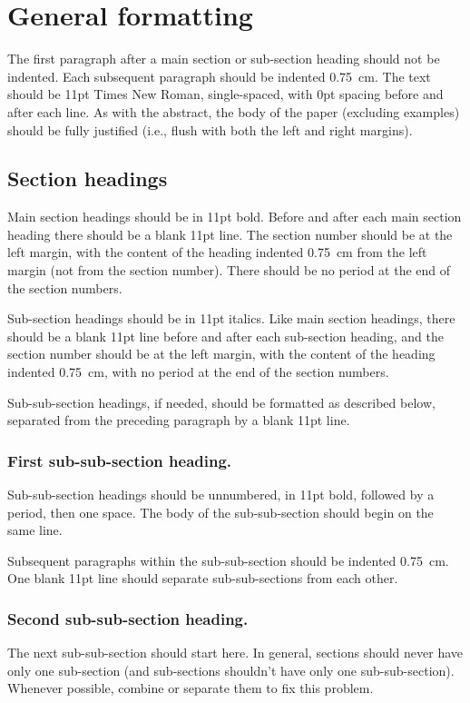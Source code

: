 \documentclass[xelatex,linguex]{TWPL}
\author{Jane Smith (in 11pt italics)}
\affiliation{University of Wherever (in 11pt italics)}
\begin{document}
\section{General formatting}

The first paragraph after a main section or sub-section heading should not be indented. Each subsequent paragraph should be indented 0.75~cm. The text should be 11pt Times New Roman, single-spaced, with 0pt spacing before and after each line. As with the abstract, the body of the paper (excluding examples) should be fully justified (i.e., flush with both the left and right margins).

\subsection{Section headings}

Main section headings should be in 11pt bold. Before and after each main section heading there should be a blank 11pt line. The section number should be at the left margin, with the content of the heading indented 0.75~cm from the left margin (not from the section number). There should be no period at the end of the section numbers.

Sub-section headings should be in 11pt italics. Like main section headings, there should be a blank 11pt line before and after each sub-section heading, and the section number should be at the left margin, with the content of the heading indented 0.75~cm, with no period at the end of the section numbers.

Sub-sub-section headings, if needed, should be formatted as described below, separated from the preceding paragraph by a blank 11pt line.

\subsubsection{First sub-sub-section heading.} Sub-sub-section headings should be unnumbered, in 11pt bold, followed by a period, then one space. The body of the sub-sub-section should begin on the same line.

Subsequent paragraphs within the sub-sub-section should be indented 0.75~cm. One blank 11pt line should separate sub-sub-sections from each other. 

\subsubsection{Second sub-sub-section heading.} The next sub-sub-section should start here. In general, sections should never have only one sub-section (and sub-sections shouldn't have only one sub-sub-section). Whenever possible, combine or separate them to fix this problem.
\end{document}

